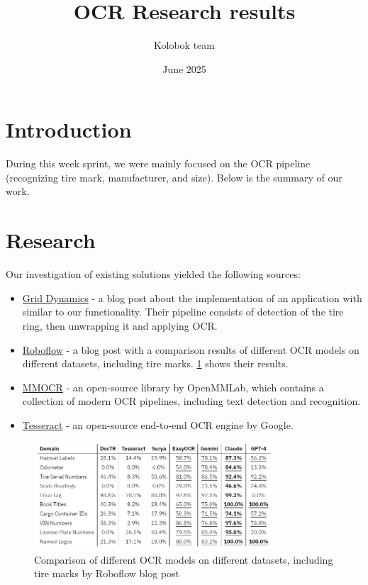 \documentclass{article}
\author{Kolobok team}
\title{OCR Research results}
\date{June 2025}
\begin{document}
\maketitle

\section{Introduction}

During this week sprint, we were mainly focused on the OCR pipeline (recognizing tire mark, manufacturer, and size). Below is the summary of our work.

\section{Research}

Our investigation of existing solutions yielded the following sources:

\begin{itemize}
    \item \href{https://www.griddynamics.com/blog/how-to-identify-vehicle-tires-using-deep-learning-visual-models}{Grid Dynamics} - a blog post about the implementation of an application with similar to our functionality. Their pipeline consists of detection of the tire ring, then unwrapping it and applying OCR.
    \item \href{https://blog.roboflow.com/best-ocr-models-text-recognition/}{Roboflow} - a blog post with a comparison results of different OCR models on different datasets, including tire marks. \ref{fig:comp_table} shows their results.
    \item \href{https://github.com/open-mmlab/mmocr}{MMOCR} - an open-source library by OpenMMLab, which contains a collection of modern OCR pipelines, including text detection and recognition.
    \item \href{https://github.com/tesseract-ocr/tesseract}{Tesseract} - an open-source end-to-end OCR engine by Google.
\end{itemize}

\begin{figure}[H]
    \centering
    \includegraphics[width=0.8\textwidth]{assets/comp_table.png}
    \caption{Comparison of different OCR models on different datasets, including tire marks by Roboflow blog post}
    \label{fig:comp_table}
\end{figure}
\end{document}
